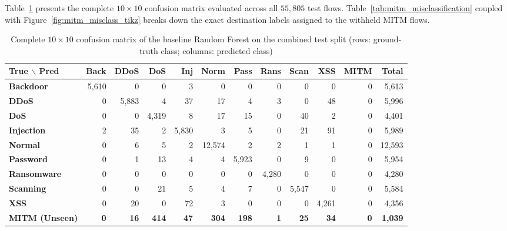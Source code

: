 Table~\ref{tab:full_confusion_matrix} presents the complete $10 \times 10$ confusion matrix evaluated across all $55{,}805$ test flows. Table~\ref{tab:mitm_misclassification} coupled with Figure~\ref{fig:mitm_misclass_tikz} breaks down the exact destination labels assigned to the withheld MITM flows.

\begin{table}[htbp]
\centering
\scriptsize
\setlength{\tabcolsep}{3.5pt}
\renewcommand{\arraystretch}{1.25}
\caption{Complete $10 \times 10$ confusion matrix of the baseline Random Forest on the combined test split (rows: ground-truth class; columns: predicted class)}
\label{tab:full_confusion_matrix}
\begin{tabular}{|l|r|r|r|r|r|r|r|r|r|r|r|}
\hline
\textbf{True $\backslash$ Pred} & \textbf{Back} & \textbf{DDoS} & \textbf{DoS} & \textbf{Inj} & \textbf{Norm} & \textbf{Pass} & \textbf{Rans} & \textbf{Scan} & \textbf{XSS} & \textbf{MITM} & \textbf{Total} \\ \hline
\textbf{Backdoor}   & 5{,}610 & 0 & 0 & 3 & 0 & 0 & 0 & 0 & 0 & 0 & 5{,}613 \\
\textbf{DDoS}       & 0 & 5{,}883 & 4 & 37 & 17 & 4 & 3 & 0 & 48 & 0 & 5{,}996 \\
\textbf{DoS}        & 0 & 0 & 4{,}319 & 8 & 17 & 15 & 0 & 40 & 2 & 0 & 4{,}401 \\
\textbf{Injection}  & 2 & 35 & 2 & 5{,}830 & 3 & 5 & 0 & 21 & 91 & 0 & 5{,}989 \\
\textbf{Normal}     & 0 & 6 & 5 & 2 & 12{,}574 & 2 & 2 & 1 & 1 & 0 & 12{,}593 \\
\textbf{Password}   & 0 & 1 & 13 & 4 & 4 & 5{,}923 & 0 & 9 & 0 & 0 & 5{,}954 \\
\textbf{Ransomware} & 0 & 0 & 0 & 0 & 0 & 0 & 4{,}280 & 0 & 0 & 0 & 4{,}280 \\
\textbf{Scanning}   & 0 & 0 & 21 & 5 & 4 & 7 & 0 & 5{,}547 & 0 & 0 & 5{,}584 \\
\textbf{XSS}        & 0 & 20 & 0 & 72 & 3 & 0 & 0 & 0 & 4{,}261 & 0 & 4{,}356 \\ \hline
\textbf{MITM (Unseen)} & \textbf{0} & \textbf{16} & \textbf{414} & \textbf{47} & \textbf{304} & \textbf{198} & \textbf{1} & \textbf{25} & \textbf{34} & \textbf{0} & \textbf{1{,}039} \\ \hline
\end{tabular}
\end{table}

